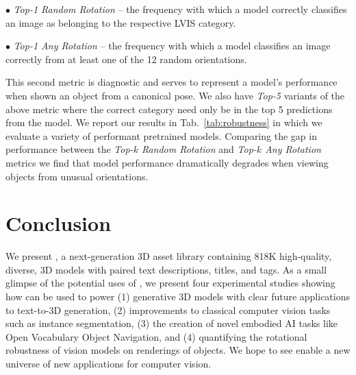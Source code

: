\noindent$\bullet$ \emph{Top-1 Random Rotation} -- the frequency with which a model correctly classifies an image as belonging to the respective \textsc{LVIS} category.

\noindent$\bullet$ \emph{Top-1 Any Rotation} -- the frequency with which a model classifies an image correctly from at least one of the 12 random orientations.

This second metric is diagnostic and serves to represent a model's performance when shown an object from a canonical pose. We also have \emph{Top-5} variants of the above metric where the correct category need only be in the top 5 predictions from the model.
We report our results in Tab.~\ref{tab:robustness} in which we evaluate a variety of performant pretrained models. Comparing the gap in performance between the \emph{Top-$k$ Random Rotation} and \emph{Top-$k$ Any Rotation} metrics we find that model performance dramatically degrades when viewing objects from unusual orientations.

\vspace{-0.05in}

\section{Conclusion}
\label{sec:conclusion}
\vspace{-0.05in}

We present \data, a next-generation 3D asset library containing 818K high-quality, diverse, 3D models with paired text descriptions, titles, and tags. As a small glimpse of the potential uses of \data, we present four experimental studies showing how \data can be used to power (1) generative 3D models with clear future applications to text-to-3D generation, (2) improvements to classical computer vision tasks such as instance segmentation, (3) the creation of novel embodied AI tasks like Open Vocabulary Object Navigation, and (4) quantifying the rotational robustness of vision models on renderings of objects. We hope to see \data enable a new universe of new applications for computer vision.

{\small
}

\newpage

